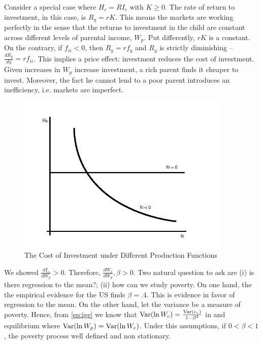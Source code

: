 \indent Consider a special case where $H_{c} = R I_{c}$ with $K \geq 0$. The rate of return to investment, in this case, is $R_{y} = rK$. This means the markets are working perfectly in the sense that the returns to investment in the child are constant across different levels of parental income, $W_{p}$. Put differently, $rK$ is a constant. On the contrary, if $f_{ii} < 0$, then $R_{y} = r f_{y}$ and $R_{y}$ is strictly diminishing --$\frac{d R_{y}}{ d y} = r f_{ii}$. This implies a price effect: investment reduces the cost of investment. Given increases in $W_{p}$ increase investment, a rich parent finds it cheaper to invest. Moreover, the fact he cannot lend to a poor parent introduces an inefficiency, i.e. markets are imperfect.

\begin{center}
\begin{figure}[H] 
\caption{The Cost of Investment under Different Production Functions}
\centering
\includegraphics[width=4in, height=3in]{Plots/Rets.png}
\end{figure}
\end{center}

\indent We showed $\frac{d I_{c}}{d W_{p}} > 0$. Therefore, $\frac{d W_{c}}{d W_{p}}, \beta > 0 $. Two natural question to ask are (i) is there regression to the mean?; (ii) how can we study poverty. On one hand, the the empirical evidence for the US finds $\beta = .4$. This is evidence in favor of regression to the mean. On the other hand, let the variance be a measure of poverty. Hence, from \eqref{eq:ige} we know that $\operatorname{Var} (\ln W_{c}) = \frac{\operatorname{Var} (\epsilon_{c})}{1 - \beta^2}$ in and equilibrium where $\operatorname{Var} (\ln W_{p})  = \operatorname{Var} (\ln W_{c}) $. Under this assumptions, if $0 < \beta < 1$, the poverty process well defined and non stationary. 

